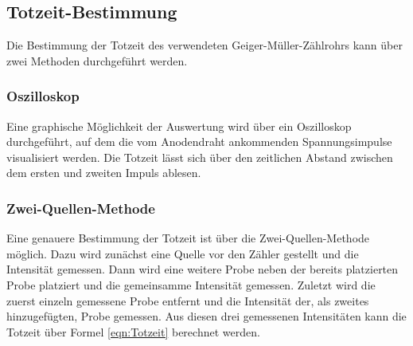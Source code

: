 \documentclass[titlepage = firstcover]{scrartcl}
\begin{document}
        \newpage
        \subsection{Totzeit-Bestimmung}
            Die Bestimmung der Totzeit des verwendeten Geiger-Müller-Zählrohrs kann über zwei Methoden durchgeführt werden.
            
            \subsubsection*{Oszilloskop}
                Eine graphische Möglichkeit der Auswertung wird über ein Oszilloskop durchgeführt, auf dem die vom Anodendraht ankommenden Spannungsimpulse visualisiert werden. Die Totzeit 
                lässt sich über den zeitlichen Abstand zwischen dem ersten und zweiten Impuls ablesen.
                
            \subsubsection*{Zwei-Quellen-Methode}
                Eine genauere Bestimmung der Totzeit ist über die Zwei-Quellen-Methode möglich. Dazu wird zunächst eine Quelle vor den Zähler gestellt und die Intensität gemessen. Dann wird eine
                weitere Probe neben der bereits platzierten Probe platziert und die gemeinsamme Intensität gemessen. Zuletzt wird die zuerst einzeln gemessene Probe entfernt und die Intensität
                der, als zweites hinzugefügten, Probe gemessen. Aus diesen drei gemessenen Intensitäten kann die Totzeit über Formel \ref{eqn:Totzeit} berechnet werden. 

                \FloatBarrier
\end{document}
